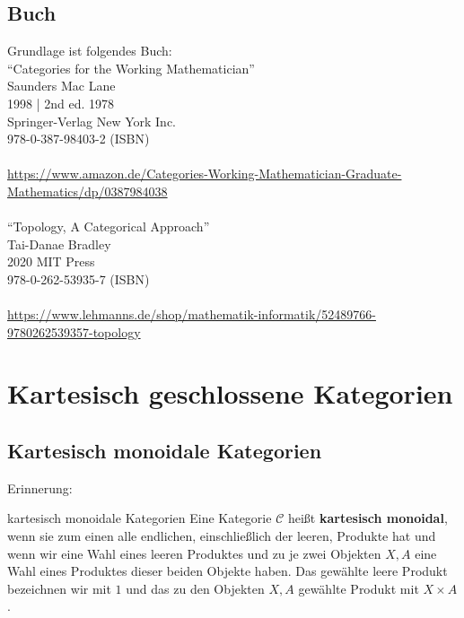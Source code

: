 \documentclass[a4paper]{amsart}
\theoremstyle{definition}
\begin{document}
\subsection*{Buch}
Grundlage ist folgendes Buch:\\
"`Categories for the Working Mathematician"'\\
Saunders Mac Lane\\
1998 | 2nd ed. 1978\\
Springer-Verlag New York Inc.\\
978-0-387-98403-2 (ISBN)\\
\\
\url{https://www.amazon.de/Categories-Working-Mathematician-Graduate-Mathematics/dp/0387984038}\\
\\
"`Topology, A Categorical Approach"'\\
Tai-Danae Bradley\\
2020 MIT Press\\
978-0-262-53935-7 (ISBN)\\ 
\\
\url{https://www.lehmanns.de/shop/mathematik-informatik/52489766-9780262539357-topology}

\section{Kartesisch geschlossene Kategorien}

\subsection{Kartesisch monoidale Kategorien}
Erinnerung:
\begin{Definition}{kartesisch monoidale Kategorien}
   Eine Kategorie $\mathcal C$ heißt \textbf{kartesisch monoidal}, wenn sie zum einen alle endlichen, einschließlich der leeren, Produkte hat und wenn wir eine Wahl eines leeren Produktes und zu je zwei Objekten $X, A$ eine Wahl eines Produktes dieser beiden Objekte haben. Das gewählte leere Produkt bezeichnen wir mit $1$ und das zu den Objekten $X, A$ gewählte Produkt mit $X \times A$. 
\end{Definition}
\end{document}
